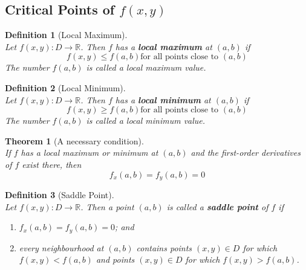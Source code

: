 \documentclass[12pt]{article}
\newtheorem{definition}{Definition}[section]
\newtheorem{theorem}{Theorem}[section]
\theoremstyle{definition}
\begin{document}
\subsection{Critical Points of $f(x,y)$}
\begin{definition}[Local Maximum]
\hfill\\\normalfont Let $f(x,y):D\to\mathbb{R}$. Then $f$ has a \textbf{local maximum} at $(a,b)$ if
\[
f(x,y)\leq f(a,b) \text{for all points close to }(a,b)
\]
The number $f(a,b)$ is called a local maximum value.
\end{definition}
\begin{definition}[Local Minimum]
\hfill\\\normalfont Let $f(x,y):D\to\mathbb{R}$. Then $f$ has a \textbf{local minimum} at $(a,b)$ if
\[
f(x,y)\geq f(a,b) \text{for all points close to }(a,b)
\]
The number $f(a,b)$ is called a local minimum value.
\end{definition}
\begin{theorem}[A necessary condition]
\hfill\\\normalfont If $f$ has a local maximum or minimum at $(a,b)$ and the first-order derivatives of $f$ exist there, then
\[
f_x(a,b)=f_y(a,b)=0
\]
\end{theorem}
\begin{definition}[Saddle Point]
\hfill\\\normalfont Let $f(x,y):D\to\mathbb{R}$. Then a point $(a,b)$ is called a \textbf{saddle point} of $f$ if
\begin{enumerate}
  \item $f_x(a,b)=f_y(a,b)=0$; and
  \item every neighbourhood at $(a,b)$ contains points $(x,y)\in D$ for which $f(x,y)<f(a,b)$ and points $(x,y)\in D$ for which $f(x,y)>f(a,b)$.
\end{enumerate}
\end{definition}
\end{document}
